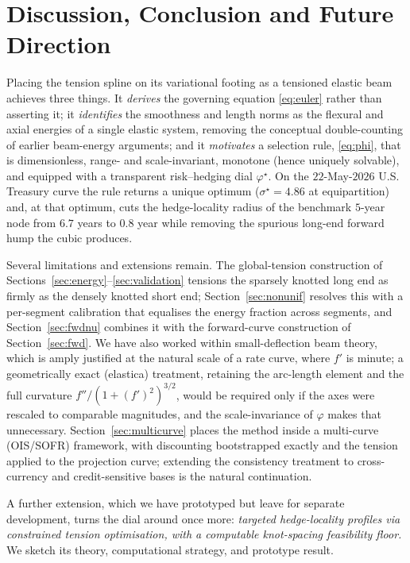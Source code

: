 \documentclass[10pt]{article}
\begin{document}
\section{Discussion, Conclusion and Future Direction}\label{sec:discussion}
Placing the tension spline on its variational footing as a tensioned elastic beam achieves
three things. It \emph{derives} the governing equation \eqref{eq:euler} rather than asserting
it; it \emph{identifies} the smoothness and length norms as the flexural and axial energies of a
single elastic system, removing the conceptual double-counting of earlier beam-energy arguments;
and it \emph{motivates} a selection rule, \eqref{eq:phi}, that is dimensionless, range- and
scale-invariant, monotone (hence uniquely solvable), and equipped with a transparent
risk--hedging dial $\varphi^\star$. On the $22$-May-$2026$ U.S. Treasury curve the rule returns
a unique optimum ($\sigma^\star=4.86$ at equipartition) and, at that optimum, cuts the
hedge-locality radius of the benchmark $5$-year node from $6.7$ years to $0.8$ year while
removing the spurious long-end forward hump the cubic produces.

Several limitations and extensions remain. The global-tension construction of
Sections~\ref{sec:energy}--\ref{sec:validation} tensions the sparsely knotted long end as firmly
as the densely knotted short end; Section~\ref{sec:nonunif} resolves this with a per-segment
calibration that equalises the energy fraction across segments, and Section~\ref{sec:fwdnu}
combines it with the forward-curve construction of Section~\ref{sec:fwd}. We have
also worked within small-deflection beam theory, which is amply justified at the natural scale of
a rate curve, where $f'$ is minute; a geometrically exact (elastica) treatment, retaining the
arc-length element and the full curvature $f''/(1+(f')^2)^{3/2}$, would be required only if the
axes were rescaled to comparable magnitudes, and the scale-invariance of $\varphi$ makes that
unnecessary. Section~\ref{sec:multicurve} places the method inside a multi-curve (OIS/SOFR)
framework, with discounting bootstrapped exactly and the tension applied to the projection
curve; extending the consistency treatment to cross-currency and credit-sensitive bases is the
natural continuation.

A further extension, which we have prototyped but leave for separate development, turns the dial
around once more: \emph{targeted hedge-locality profiles via constrained tension optimisation,
with a computable knot-spacing feasibility floor.} We sketch its theory, computational strategy,
and prototype result.
\end{document}
